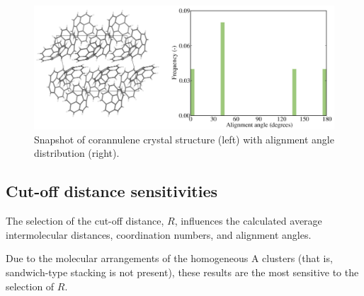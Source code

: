 %
\begin{figure}[!tbh]
\centering
\includegraphics[width=0.8\linewidth]{Figures/corannulene_crystal.eps}
\caption{Snapshot of corannulene crystal structure (left) with alignment angle distribution (right).}
\label{figSI:corannulene_crystal}
\end{figure}
%


\subsection{Cut-off distance sensitivities}
\label{secSI:cutoffs}
The selection of the cut-off distance, $R$, influences the calculated average intermolecular distances, coordination numbers, and alignment angles.

Due to the molecular arrangements of the homogeneous A clusters (that is, sandwich-type stacking is not present), these results are the most sensitive to the selection of $R$.


